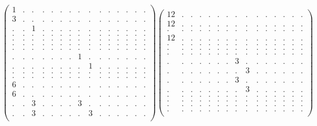 \documentclass[12pt,a4paper]{amsart}
\begin{document}
\begin{align*}
\left(\begin{array}{rrrrrrrrrrrrrrr}%
1&.&.&.&.&.&.&.&.&.&.&.&.&.&.\\%
3&.&.&.&.&.&.&.&.&.&.&.&.&.&.\\%
.&.&1&.&.&.&.&.&.&.&.&.&.&.&.\\%
.&.&.&.&.&.&.&.&.&.&.&.&.&.&.\\%
.&.&.&.&.&.&.&.&.&.&.&.&.&.&.\\%
.&.&.&.&.&.&.&.&.&.&.&.&.&.&.\\%
.&.&.&.&.&.&.&.&.&.&.&.&.&.&.\\%
.&.&.&.&.&.&.&1&.&.&.&.&.&.&.\\%
.&.&.&.&.&.&.&.&1&.&.&.&.&.&.\\%
.&.&.&.&.&.&.&.&.&.&.&.&.&.&.\\%
.&.&.&.&.&.&.&.&.&.&.&.&.&.&.\\%
6&.&.&.&.&.&.&.&.&.&.&.&.&.&.\\%
6&.&.&.&.&.&.&.&.&.&.&.&.&.&.\\%
.&.&3&.&.&.&.&3&.&.&.&.&.&.&.\\%
.&.&3&.&.&.&.&.&3&.&.&.&.&.&.\\%
\end{array}\right)%
\left(\begin{array}{rrrrrrrrrrrrrrr}%
12&.&.&.&.&.&.&.&.&.&.&.&.&.&.\\%
12&.&.&.&.&.&.&.&.&.&.&.&.&.&.\\%
.&.&.&.&.&.&.&.&.&.&.&.&.&.&.\\%
12&.&.&.&.&.&.&.&.&.&.&.&.&.&.\\%
.&.&.&.&.&.&.&.&.&.&.&.&.&.&.\\%
.&.&.&.&.&.&.&.&.&.&.&.&.&.&.\\%
.&.&.&.&.&.&.&.&.&.&.&.&.&.&.\\%
.&.&.&.&.&.&.&3&.&.&.&.&.&.&.\\%
.&.&.&.&.&.&.&.&3&.&.&.&.&.&.\\%
.&.&.&.&.&.&.&3&.&.&.&.&.&.&.\\%
.&.&.&.&.&.&.&.&3&.&.&.&.&.&.\\%
.&.&.&.&.&.&.&.&.&.&.&.&.&.&.\\%
.&.&.&.&.&.&.&.&.&.&.&.&.&.&.\\%
.&.&.&.&.&.&.&.&.&.&.&.&.&.&.\\%
.&.&.&.&.&.&.&.&.&.&.&.&.&.&.\\%
\end{array}\right)%
\end{align*}
\end{document}
